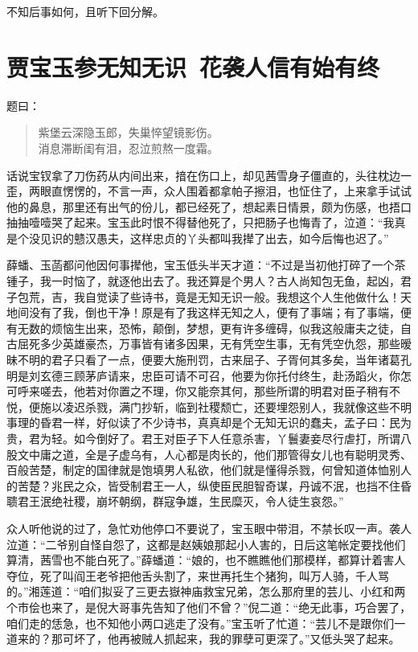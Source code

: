 \documentclass[12pt,oneside]{book}
\newenvironment{shici}{%
\begin{verse}%
\centering\large\hspace{12pt}}%
{\end{verse}}
\begin{document}
不知后事如何，且听下回分解。

 
\chapter{贾宝玉参无知无识~花袭人信有始有终}

题曰：

\begin{shici}
紫堡云深隐玉郎，失巢悴望镜影伤。\\
消息滞断闺有泪，忍泣煎熬一度霜。
\end{shici}

话说宝钗拿了刀伤药从内间出来，揞在伤口上，却见茜雪身子僵直的，头往枕边一歪，两眼直愣愣的，不言一声，众人围着都拿帕子擦泪，也怔住了，上来拿手试试他的鼻息，那里还有出气的份儿，都已经死了，想起素日情景，颇为伤感，也捂口抽抽噎噎哭了起来。宝玉此时恨不得替他死了，只把肠子也悔青了，泣道：“我真是个没见识的戆汉愚夫，这样忠贞的丫头都叫我撵了出去，如今后悔也迟了。”

薛蟠、玉菡都问他因何事撵他，宝玉低头半天才道：“不过是当初他打碎了一个茶锺子，我一时恼了，就逐他出去了。我还算是个男人？古人尚知包无鱼，起凶，君子包荒，吉，我自觉读了些诗书，竟是无知无识一般。我想这个人生他做什么！天地间没有了我，倒也干净！原是有了我这样无知之人，便有了事端；有了事端，便有无数的烦恼生出来，恐怖，颠倒，梦想，更有许多缠碍，似我这般庸夫之徒，自古屈死多少英雄豪杰，万事皆有诸多因果，无有凭空生事，无有凭空仇怨，那些暧昧不明的君子只看了一点，便要大施刑罚，古来屈子、子胥何其多矣，当年诸葛孔明是刘玄德三顾茅庐请来，忠臣可请不可召，他要为你托付终生，赴汤蹈火，你怎可呼来嗟去，他若对你置之不理，你又能奈其何，那些所谓的明君对臣子稍有不悦，便施以凌迟杀戮，满门抄斩，临到社稷颓亡，还要埋怨别人，我就像这些不明事理的昏君一样，好似读了不少诗书，真真却是个无知无识的蠢夫，孟子曰：民为贵，君为轻。如今倒好了。君王对臣子下人任意杀害，丫鬟妻妾尽行虐打，所谓八股文中庸之道，全是子虚乌有，人心都是肉长的，他们那管得女儿也有聪明灵秀、百般苦楚，制定的国律就是饱填男人私欲，他们就是懂得杀戮，何曾知道体恤别人的苦楚？兆民之众，皆受制君王一人，纵使臣民胆智奇谋，丹诚不泯，也挡不住昏聩君王泯绝社稷，崩坏朝纲，群寇争雄，生民糜灭，令人徒生哀怨。”

众人听他说的过了，急忙劝他停口不要说了，宝玉眼中带泪，不禁长叹一声。袭人泣道：“二爷别自怪自怨了，这都是赵姨娘那起小人害的，日后这笔帐定要找他们算清，茜雪也不能白死了。”薛蟠道：“娘的，也不瞧瞧他们那模样，都算计着害人夺位，死了叫阎王老爷把他舌头割了，来世再托生个猪狗，叫万人骑，千人骂的。”湘莲道：“咱们拟妥了三更去嶽神庙救宝兄弟，怎么那府里的芸儿、小红和两个市侩也来了，是倪大哥事先告知了他们不曾？”倪二道：“绝无此事，巧合罢了，咱们走的恁急，也不知他小两口逃走了没有。”宝玉听了忙道：“芸儿不是跟你们一道来的？那可坏了，他再被贼人抓起来，我的罪孽可更深了。”又低头哭了起来。
\end{document}
